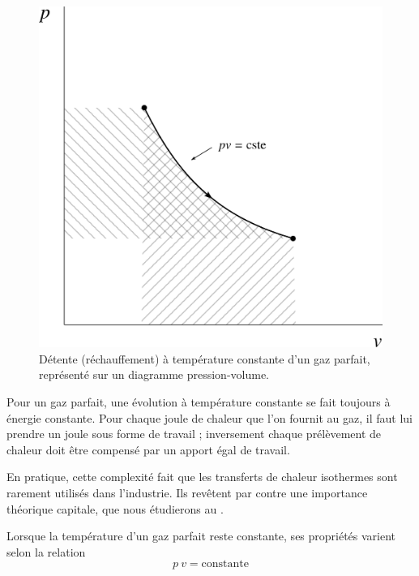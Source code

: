 		\begin{figure}
			\begin{center}
				\includegraphics[width=\pvdiagramwidth]{images/pv_isotherme.png}
			\end{center}
			\caption{Détente (réchauffement) à température constante d’un gaz parfait, représenté sur un diagramme pression-volume.}
			\label{fig_gp_température_constante_pv}
		\end{figure}		

		Pour un gaz parfait, une évolution à température constante se fait toujours à énergie constante. Pour chaque joule de chaleur que l’on fournit au gaz, il faut lui prendre un joule sous forme de travail ; inversement chaque prélèvement de chaleur doit être compensé par un apport égal de travail.
		
		En pratique, cette complexité fait que les transferts de chaleur isothermes sont rarement utilisés dans l’industrie. Ils revêtent par contre une importance théorique capitale, que nous étudierons au \courssept.
		
		Lorsque la température d’un gaz parfait reste constante, ses propriétés varient selon la relation 
		\begin{equation}
			p \ v = \text{constante}
			\label{eq_pvconstante}
		\end{equation}
		

